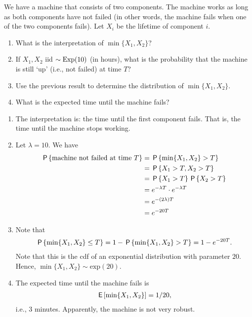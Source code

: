 \begin{exercise}
We have a machine that consists of two components.
The machine works as long as both components have not failed (in other words, the machine fails when one of the two components fails).
Let $X_i$ be the lifetime of component $i$.
\begin{enumerate}
\item What is the interpretation of $\min\{X_1, X_{2}\}$?
\item If $X_1, X_2$ iid $\sim \Exp{10}$ (in hours), what is the probability that the machine is still `up' (i.e., not failed) at time $T$?
\item Use the previous result to determine the distribution of $\min \{X_1, X_2\}$.
\item What is the expected time until the machine fails?
\end{enumerate}
\begin{solution}
\begin{enumerate}
    \item The interpretation is: the time until the first component fails. That is, the time until the machine stops working.
    \item Let $\lambda = 10$. We have
    \begin{align}
        \P{\text{machine not failed at time $T$}} &= \P{\min\{X_1, X_2\} > T} \\
        &= \P{X_1 > T, X_2 > T} \\
        &= \P{X_1 > T}\P{X_2 > T} \\
        &= e^{-\lambda T} \cdot e^{-\lambda T} \\
        &= e^{-(2\lambda)T} \\
        &= e^{-20T} \\
    \end{align}
    \item Note that
    \begin{align}
        \P{\min\{X_1, X_2\} \leq T} = 1 - \P{\min\{X_1, X_2\} > T} = 1 - e^{-20T}.
    \end{align}
    Note that this is the cdf of an exponential distribution with parameter $20$. Hence, $\min\{X_1, X_2\} \sim \text{exp}(20)$.
    \item The expected time until the machine fails is
    \begin{align}
        \E{\min\{X_1, X_2\}} = 1/20,
    \end{align}
    i.e., 3 minutes. Apparently, the machine is not very robust.
\end{enumerate}
\end{solution}
\end{exercise}

